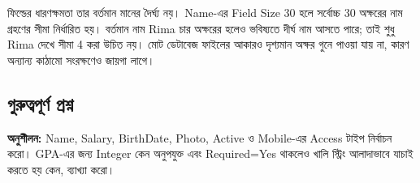 ফিল্ডের ধারণক্ষমতা তার বর্তমান মানের দৈর্ঘ্য নয়। Name-এর Field Size 30 হলে সর্বোচ্চ 30 অক্ষরের নাম গ্রহণের সীমা নির্ধারিত হয়। বর্তমান নাম Rima চার অক্ষরের হলেও ভবিষ্যতে দীর্ঘ নাম আসতে পারে; তাই শুধু Rima দেখে সীমা 4 করা উচিত নয়। মোট ডেটাবেজ ফাইলের আকারও দৃশ্যমান অক্ষর গুনে পাওয়া যায় না, কারণ অন্যান্য কাঠামো সংরক্ষণেও জায়গা লাগে।

\subsection{গুরুত্বপূর্ণ প্রশ্ন}
\textbf{অনুশীলন:} Name, Salary, BirthDate, Photo, Active ও Mobile-এর Access টাইপ নির্বাচন করো। GPA-এর জন্য Integer কেন অনুপযুক্ত এবং Required=Yes থাকলেও খালি স্ট্রিং আলাদাভাবে যাচাই করতে হয় কেন, ব্যাখ্যা করো।


